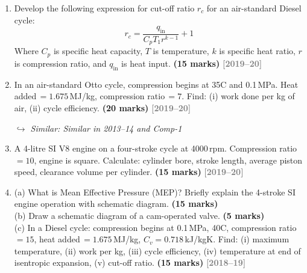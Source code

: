 \documentclass[12pt,a3paper]{article}
\newcommand{\yr}[1]{\hfill\textcolor{gray}{\small\textbf{[#1]}}}
\newcommand{\mk}[1]{\textcolor{orange!70!black}{\small\textbf{(#1 marks)}}}
\newcommand{\variant}[1]{\par\vspace{1pt}\textcolor{blue!50!black}%
  {\footnotesize\textit{$\hookrightarrow$ Similar: #1}}}
\begin{document}
\begin{enumerate}
\item \label{qlabel:A2-Q4}
Develop the following expression for cut-off ratio $r_c$ for an air-standard Diesel cycle:
\[r_c = \frac{q_{\mathrm{in}}}{C_p T_1 r^{k-1}} + 1\]
Where $C_p$ is specific heat capacity, $T$ is temperature, $k$ is specific heat ratio, $r$ is compression ratio, and $q_{\mathrm{in}}$ is heat input. \mk{15}
\yr{2019--20}




\item \label{qlabel:A2-Q8}
In an air-standard Otto cycle, compression begins at 35\textdegree C and 0.1\,MPa. Heat added\,$= 1.675$\,MJ/kg, compression ratio\,$= 7$. Find: (i) work done per kg of air, (ii) cycle efficiency. \mk{20}
\yr{2019--20}
\variant{Similar in 2013--14 and Comp-1}




\item \label{qlabel:A2-Q9}
A 4-litre SI V8 engine on a four-stroke cycle at 4000\,rpm. Compression ratio\,$= 10$, engine is square. Calculate: cylinder bore, stroke length, average piston speed, clearance volume per cylinder. \mk{15}
\yr{2019--20}




\item \label{qlabel:A2-Q14}
(a) What is Mean Effective Pressure (MEP)? Briefly explain the 4-stroke SI engine operation with schematic diagram. \mk{15}\\
(b) Draw a schematic diagram of a cam-operated valve. \mk{5}\\
(c) In a Diesel cycle: compression begins at 0.1\,MPa, 40\textdegree C, compression ratio\,$= 15$, heat added\,$= 1.675$\,MJ/kg, $C_v = 0.718$\,kJ/kgK. Find: (i) maximum temperature, (ii) work per kg, (iii) cycle efficiency, (iv) temperature at end of isentropic expansion, (v) cut-off ratio. \mk{15}
\yr{2018--19}





\end{enumerate}
\end{document}
